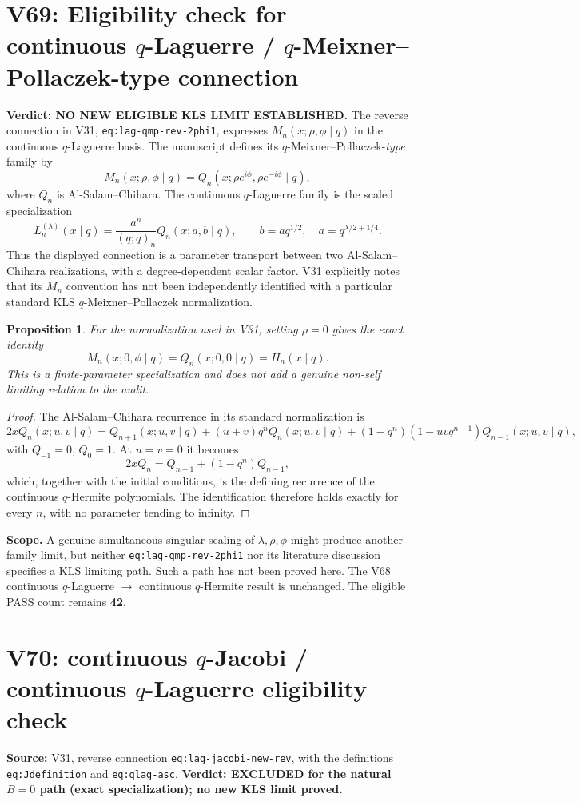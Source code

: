\documentclass[11pt]{article}
\newtheorem{proposition}{Proposition}
\begin{document}
\section{V69: Eligibility check for continuous $q$-Laguerre / $q$-Meixner--Pollaczek-type connection}
\noindent\textbf{Verdict: NO NEW ELIGIBLE KLS LIMIT ESTABLISHED.}
The reverse connection in V31, \texttt{eq:lag-qmp-rev-2phi1}, expresses
$M_n(x;\rho,\phi\mid q)$ in the continuous $q$-Laguerre basis.
The manuscript defines its $q$-Meixner--Pollaczek-\emph{type} family by
\[
 M_n(x;\rho,\phi\mid q)
 =Q_n(x;\rho e^{i\phi},\rho e^{-i\phi}\mid q),
\]
where $Q_n$ is Al-Salam--Chihara.  The continuous $q$-Laguerre
family is the scaled specialization
\[
 L_n^{(\lambda)}(x\mid q)
 =\frac{a^n}{(q;q)_n}Q_n(x;a,b\mid q),
 \qquad b=aq^{1/2},\quad a=q^{\lambda/2+1/4}.
\]
Thus the displayed connection is a parameter transport between two
Al-Salam--Chihara realizations, with a degree-dependent scalar factor.
V31 explicitly notes that its $M_n$ convention has not been
independently identified with a particular standard KLS
$q$-Meixner--Pollaczek normalization.

\begin{proposition}
For the normalization used in V31, setting $\rho=0$ gives the exact
identity
\[
 M_n(x;0,\phi\mid q)=Q_n(x;0,0\mid q)=H_n(x\mid q).
\]
This is a finite-parameter specialization and does not add a genuine
non-self limiting relation to the audit.
\end{proposition}
\begin{proof}
The Al-Salam--Chihara recurrence in its standard normalization is
\[
 2xQ_n(x;u,v\mid q)=Q_{n+1}(x;u,v\mid q)
 +(u+v)q^nQ_n(x;u,v\mid q)
 +(1-q^n)(1-uvq^{n-1})Q_{n-1}(x;u,v\mid q),
\]
with $Q_{-1}=0$, $Q_0=1$.  At $u=v=0$ it becomes
\[
 2xQ_n=Q_{n+1}+(1-q^n)Q_{n-1},
\]
which, together with the initial conditions, is the defining recurrence
of the continuous $q$-Hermite polynomials.  The identification therefore
holds exactly for every $n$, with no parameter tending to infinity.
\end{proof}
\noindent\textbf{Scope.} A genuine simultaneous singular scaling of
$\lambda,\rho,\phi$ might produce another family limit, but neither
\texttt{eq:lag-qmp-rev-2phi1} nor its literature discussion specifies a
KLS limiting path.  Such a path has not been proved here.  The V68
continuous $q$-Laguerre $\to$ continuous $q$-Hermite result is unchanged.
The eligible PASS count remains \textbf{42}.


\section{V70: continuous $q$-Jacobi / continuous $q$-Laguerre eligibility check}
\noindent\textbf{Source:} V31, reverse connection
\texttt{eq:lag-jacobi-new-rev}, with the definitions
\texttt{eq:Jdefinition} and \texttt{eq:qlag-asc}.
\textbf{Verdict: EXCLUDED for the natural $B=0$ path (exact
specialization); no new KLS limit proved.}
\end{document}
